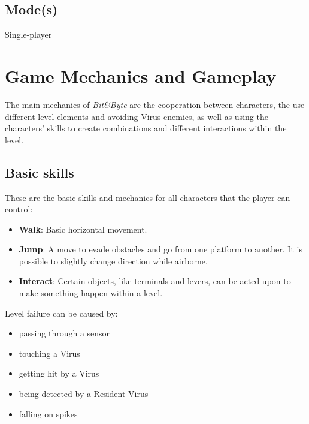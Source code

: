 \documentclass[12pt, a4paper]{report}
\begin{document}
\section*{Mode(s)}
Single-player

\chapter{Game Mechanics and Gameplay}
The main mechanics of \textit{Bit&Byte} are the cooperation between characters, the use different level elements and avoiding Virus enemies, as well as using the characters’ skills to create combinations and different interactions within the level.

\section*{Basic skills}
These are the basic skills and mechanics for all characters that the player can control:
\begin{itemize}
	\item \textbf{Walk}: Basic horizontal movement.
	\item \textbf{Jump}: A move to evade obstacles and go from one platform to another. It is possible to slightly change direction while airborne.
	\item \textbf{Interact}: Certain objects, like terminals and levers, can be acted upon to make something happen within a level.
\end{itemize}

Level failure can be caused by:
\begin{itemize}
  \item passing through a sensor
  \item touching a Virus
	\item getting hit by a Virus
  \item being detected by a Resident Virus
	\item falling on spikes
\end{itemize}
\end{document}
